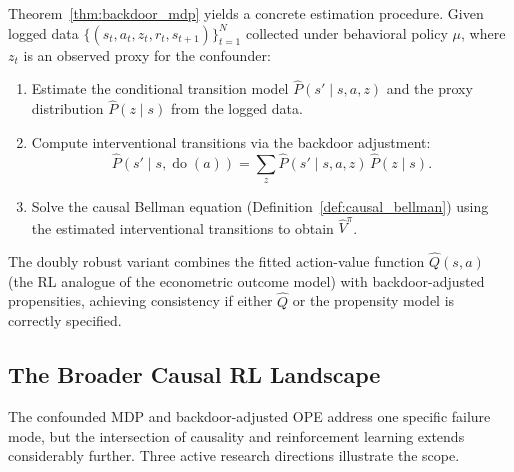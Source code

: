 Theorem~\ref{thm:backdoor_mdp} yields a concrete estimation procedure. Given logged data $\{(s_t, a_t, z_t, r_t, s_{t+1})\}_{t=1}^N$ collected under behavioral policy $\mu$, where $z_t$ is an observed proxy for the confounder:
\begin{enumerate}
\item Estimate the conditional transition model $\hat{P}(s' \mid s, a, z)$ and the proxy distribution $\hat{P}(z \mid s)$ from the logged data.
\item Compute interventional transitions via the backdoor adjustment:
\begin{equation}
\hat{P}(s' \mid s, \operatorname{do}(a)) = \sum_{z} \hat{P}(s' \mid s, a, z) \, \hat{P}(z \mid s).
\label{eq:backdoor_estimator}
\end{equation}
\item Solve the causal Bellman equation (Definition~\ref{def:causal_bellman}) using the estimated interventional transitions to obtain $\hat{V}^\pi$.
\end{enumerate}
The doubly robust variant combines the fitted action-value function $\hat{Q}(s,a)$ (the RL analogue of the econometric outcome model) with backdoor-adjusted propensities, achieving consistency if either $\hat{Q}$ or the propensity model is correctly specified.

\subsection{The Broader Causal RL Landscape}
\label{subsec:causal_rl_landscape}

The confounded MDP and backdoor-adjusted OPE address one specific failure mode, but the intersection of causality and reinforcement learning extends considerably further. Three active research directions illustrate the scope.


